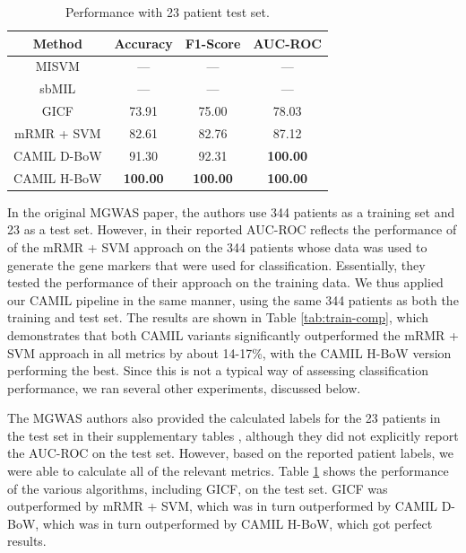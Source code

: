 \begin{table}[t]
\begin{center}
\begin{minipage}{0.4\textwidth}
\caption{Performance with 23 patient test set.} 
\label{tab:test-comp}
\begin{tabular}{|c|ccc|}\hline
Method & Accuracy & F1-Score & AUC-ROC\\\hline
MISVM & --- & --- & ---\\\hline
sbMIL & --- & --- & ---\\\hline
GICF & 73.91 & 75.00 & 78.03\\\hline
mRMR + SVM & 82.61 & 82.76 & 87.12\\\hline 
CAMIL D-BoW & 91.30 & 92.31 & \bf{100.00}\\\hline
CAMIL H-BoW & \bf{100.00} & \bf{100.00} & \bf{100.00}\\\hline
\end{tabular}
\end{minipage}
\end{center}
\end{table}





In the original MGWAS paper, the authors use 344 patients as a training set and 23 as a test set. However, in their reported AUC-ROC reflects the performance of of the mRMR + SVM approach on the 344 patients whose data was used to generate the gene markers that were used for classification. Essentially, they tested the performance of their approach on the training data. We thus applied our CAMIL pipeline in the same manner, using the same 344 patients as both the training and test set. The results are shown in Table \ref{tab:train-comp}, which demonstrates that both CAMIL variants significantly outperformed the mRMR + SVM approach in all metrics by about 14-17\%, with the CAMIL H-BoW version performing the best. Since this is not a typical way of assessing classification performance, we ran several other experiments, discussed below. 

The MGWAS authors also provided the calculated labels for the 23 patients in the test set in their supplementary tables \cite{qin041012}, although they did not explicitly report the AUC-ROC on the test set. However, based on the reported patient labels, we were able to calculate all of the relevant metrics. Table \ref{tab:test-comp} shows the performance of the various algorithms, including GICF, on the test set. GICF was outperformed by mRMR + SVM, which was in turn outperformed by CAMIL D-BoW, which was in turn outperformed by CAMIL H-BoW, which got perfect results.

